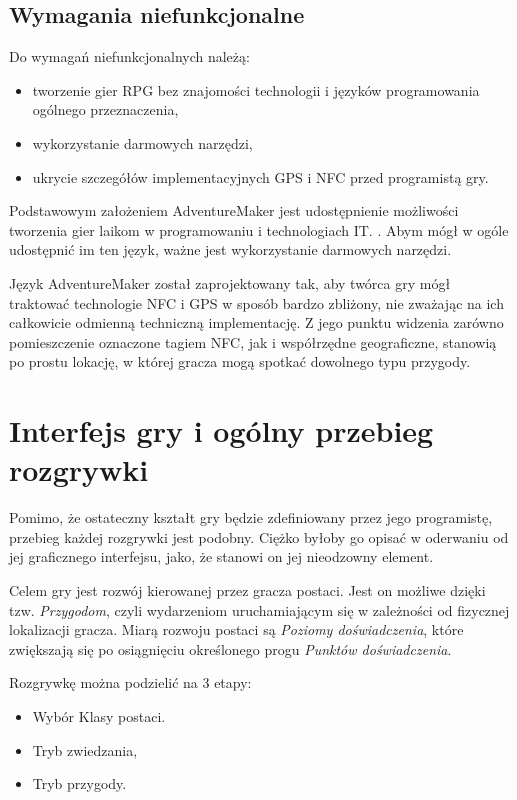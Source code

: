 \documentclass[openright]{xmgr}
\begin{document}
\section{Wymagania niefunkcjonalne}
Do wymagań niefunkcjonalnych należą:
\begin{itemize}
	\item tworzenie gier RPG bez znajomości technologii i języków programowania ogólnego przeznaczenia,
	\item wykorzystanie darmowych narzędzi,
	\item ukrycie szczegółów implementacyjnych GPS i NFC przed programistą gry.
\end{itemize}

Podstawowym założeniem AdventureMaker jest udostępnienie możliwości tworzenia gier laikom w programowaniu i technologiach IT. . Abym mógł w ogóle udostępnić im ten język, ważne jest wykorzystanie darmowych narzędzi.

Język AdventureMaker został zaprojektowany tak, aby twórca gry mógł traktować technologie NFC i GPS w sposób bardzo zbliżony, nie zważając na ich  całkowicie odmienną techniczną implementację. Z jego punktu widzenia zarówno pomieszczenie oznaczone tagiem NFC, jak i współrzędne geograficzne, stanowią po prostu lokację, w której gracza mogą spotkać dowolnego typu przygody. 

\chapter{Interfejs gry i ogólny przebieg rozgrywki}

Pomimo, że ostateczny kształt gry będzie zdefiniowany przez jego programistę, przebieg każdej rozgrywki jest podobny. Ciężko byłoby go opisać w oderwaniu od jej graficznego interfejsu, jako, że stanowi on jej nieodzowny element. 

Celem gry jest rozwój kierowanej przez gracza postaci. Jest on możliwe dzięki tzw. \textit{Przygodom}, czyli wydarzeniom uruchamiającym się w zależności od fizycznej lokalizacji gracza. Miarą rozwoju postaci są \textit{Poziomy doświadczenia}, które zwiększają się po osiągnięciu określonego progu \textit{Punktów doświadczenia}.

Rozgrywkę można podzielić na 3 etapy:
\begin{itemize}
	\item Wybór Klasy postaci.
	\item Tryb zwiedzania,
	\item Tryb przygody.
\end{itemize}
\end{document}
